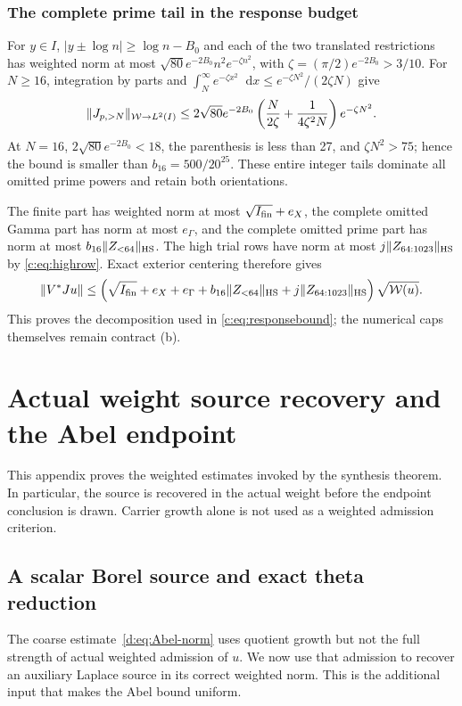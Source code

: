 \documentclass[11pt,a4paper]{article}
\numberwithin{equation}{section}
\theoremstyle{definition}\newtheorem{definition}[theorem]{Definition}
\theoremstyle{remark}\newtheorem{remark}[theorem]{Remark}
\newcommand{\dd}{\mathop{}\!\mathrm d}\newcommand{\one}{\mathbf1}
\begin{document}
\subsubsection{The complete prime tail in the response budget}
For $y\in I$, $|y\pm\log n|\ge\log n-{B_0}$ and each of the two
translated restrictions has weighted norm at most
$\sqrt{80}e^{-2{B_0}}n^2e^{-\zeta n^2}$, with
$\zeta=(\pi/2)e^{-2{B_0}}>3/10$. For $N\ge16$, integration by parts and
$\int_N^\infty e^{-\zeta x^2}\dd x\le
 e^{-\zeta N^2}/(2\zeta N)$ give
\[
 \lVert J_{p,>N}\rVert_{\mathcal W\to L^2(I)}
 \le2\sqrt{80}e^{-2{B_0}}
 \left(\frac{N}{2\zeta}+\frac1{4\zeta^2N}\right)e^{-\zeta N^2}.
\]
At $N=16$, $2\sqrt{80}e^{-2{B_0}}<18$, the parenthesis is less than 27,
and $\zeta N^2>75$; hence the bound is smaller than
$b_{16}=500/20^{25}$. These entire integer tails dominate all omitted
prime powers and retain both orientations.


The finite part has weighted norm at most $\sqrt{I_{\rm fin}}+e_X$,
the complete omitted Gamma part has norm at most $e_\Gamma$,
and the complete omitted prime part has norm at most
$b_{16}\lVert Z_{<64}\rVert_{\mathrm{HS}}$.
The high trial rows have norm at most $j\lVert Z_{64:1023}\rVert_{\mathrm{HS}}$ by
\eqref{c:eq:highrow}. Exact exterior centering therefore gives
\[
 \lVert V^*Ju\rVert\le
 \left(\sqrt{I_{\rm fin}}+e_X+e_\Gamma+
 b_{16}\lVert Z_{<64}\rVert_{\mathrm{HS}}
 +j\lVert Z_{64:1023}\rVert_{\mathrm{HS}}\right)\sqrt{\mathcal W(u)}.
\]
This proves the decomposition used in \eqref{c:eq:responsebound};
the numerical caps themselves remain contract (b).


\section{Actual weight source recovery and the Abel endpoint}\label{app:abel}
This appendix proves the weighted estimates invoked by the synthesis theorem. In particular, the source is recovered in the actual weight before the endpoint conclusion is drawn. Carrier growth alone is not used as a weighted admission criterion.


\subsection{A scalar Borel source and exact theta reduction}\label{d:sec:scalar-source}

The coarse estimate~\eqref{d:eq:Abel-norm} uses quotient growth but not the full strength of actual weighted admission of $u$. We now use that admission to recover an auxiliary Laplace source in its correct weighted norm. This is the additional input that makes the Abel bound uniform.
\end{document}
